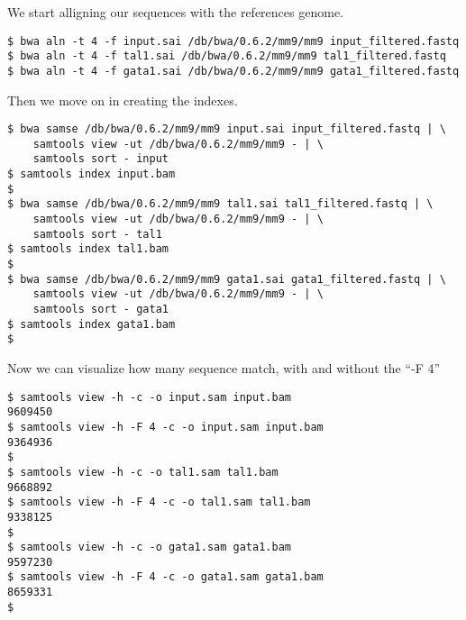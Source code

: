 \documentclass[11pt]{article} %
\begin{document}
We start alligning our sequences with the references genome.

\begin{lstlisting}
$ bwa aln -t 4 -f input.sai /db/bwa/0.6.2/mm9/mm9 input_filtered.fastq
$ bwa aln -t 4 -f tal1.sai /db/bwa/0.6.2/mm9/mm9 tal1_filtered.fastq
$ bwa aln -t 4 -f gata1.sai /db/bwa/0.6.2/mm9/mm9 gata1_filtered.fastq
\end{lstlisting}

Then we move on in creating the indexes.

\begin{lstlisting}
$ bwa samse /db/bwa/0.6.2/mm9/mm9 input.sai input_filtered.fastq | \
    samtools view -ut /db/bwa/0.6.2/mm9/mm9 - | \
    samtools sort - input
$ samtools index input.bam
$
$ bwa samse /db/bwa/0.6.2/mm9/mm9 tal1.sai tal1_filtered.fastq | \
    samtools view -ut /db/bwa/0.6.2/mm9/mm9 - | \
    samtools sort - tal1
$ samtools index tal1.bam
$
$ bwa samse /db/bwa/0.6.2/mm9/mm9 gata1.sai gata1_filtered.fastq | \
    samtools view -ut /db/bwa/0.6.2/mm9/mm9 - | \
    samtools sort - gata1
$ samtools index gata1.bam
$
\end{lstlisting}

Now we can visualize how many sequence match, with and without the ``-F 4''

\begin{lstlisting}
$ samtools view -h -c -o input.sam input.bam
9609450
$ samtools view -h -F 4 -c -o input.sam input.bam
9364936
$
$ samtools view -h -c -o tal1.sam tal1.bam
9668892
$ samtools view -h -F 4 -c -o tal1.sam tal1.bam
9338125
$
$ samtools view -h -c -o gata1.sam gata1.bam
9597230
$ samtools view -h -F 4 -c -o gata1.sam gata1.bam
8659331
$
\end{lstlisting}
\end{document}
